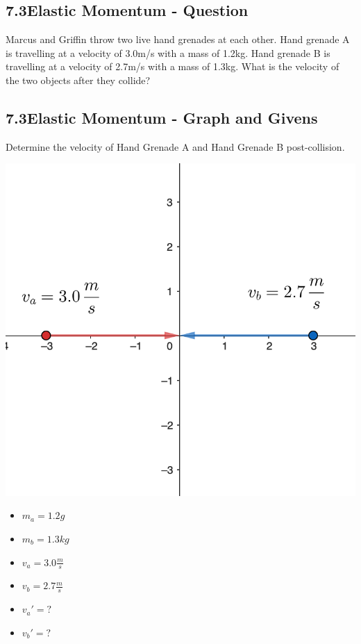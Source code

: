 \subsection*{7.3\hspace*{0.5cm}Elastic Momentum - Question}
Marcus and Griffin throw two live hand grenades at each other. Hand grenade A is travelling at a velocity of 3.0m/s with a mass of 1.2kg. Hand grenade B is travelling at a velocity of 2.7m/s with a mass of 1.3kg. What is the velocity of the two objects after they collide?
\subsection*{7.3\hspace*{0.5cm}Elastic Momentum - Graph and Givens}
Determine the velocity of Hand Grenade A and Hand Grenade B post-collision.\newline\newline
\begin{minipage}{0.5\textwidth}
    \includegraphics[scale=0.33]{./images/elastic_collision}
\end{minipage}
\begin{minipage}{0.5\textwidth}
    \begin{itemize}
        \item $m_{a} = 1.2g$
        \item $m_{b} = 1.3kg$
        \item $v_{a} = 3.0\frac{m}{s}$
        \item $v_{b} = 2.7\frac{m}{s}$
        \item $v_{a}\prime = ?$
        \item $v_{b}\prime = ?$
    \end{itemize}
\end{minipage}
